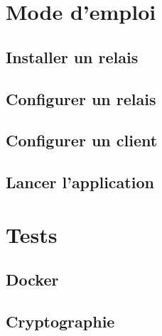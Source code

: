 \documentclass[a4paper,12pt]{report}
\begin{document}
\newpage	
\section{Mode d'emploi}
	\subsection{Installer un relais}
	
	\subsection{Configurer un relais}
	
	\subsection{Configurer un client}

	\subsection{Lancer l'application}
	
\newpage	
\section{Tests}
	\subsection{Docker}
	
	\subsection{Cryptographie}
\end{document}
